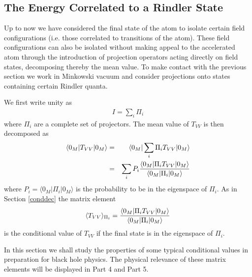 \documentclass[12pt]{article}
\begin{document}
\subsection{The Energy Correlated to a Rindler State}\label{corrR}

Up to now we have considered the final state of the atom
to  isolate certain field configurations (i.e. those
correlated to transitions of the atom). These field
configurations can also be isolated without making appeal
to the accelerated atom through the
introduction of projection operators acting directly
on field states, decomposing thereby the
mean value. To make contact with the previous section we
work in Minkowski vacuum and consider projections onto
states containing certain Rindler quanta.

We first write
unity as
\begin{eqnarray}
I = \sum_i \Pi_i
\end{eqnarray}
 where $\Pi_i$ are a complete set of projectors.
The mean value of $T_{VV}$ is then decomposed as
\begin{eqnarray}
\langle 0_M \vert T_{VV} \vert 0_M \rangle &=&
\langle 0_M \vert \sum_i \Pi_i T_{VV} \vert 0_M \rangle
\nonumber\\
&=& \sum_i P_i {
\langle 0_M \vert  \Pi_i T_{VV} \vert 0_M \rangle
\over
\langle 0_M \vert \Pi_i \vert 0_M \rangle  }
\label{r1}
\end{eqnarray}
where $P_i = \langle 0_M \vert \Pi_i \vert 0_M \rangle$
is the probability to be in the eigenspace of $\Pi_i$. As
in Section \ref{conddec} the matrix element
\begin{eqnarray}
\langle T_{VV} \rangle_{\Pi_i}=
{\langle 0_M \vert  \Pi_i T_{VV} \vert 0_M \rangle \over
\langle 0_M \vert \Pi_i \vert 0_M \rangle}
\label{TPi}
\end{eqnarray}
is the
conditional value of $T_{VV}$ if the final state is in
the eigenspace of $\Pi_i$.

In this section we shall study the properties
of some
typical conditional values in preparation for black hole
physics.
The physical relevance of these matrix elements
will be displayed in Part 4 and Part 5.
\end{document}
